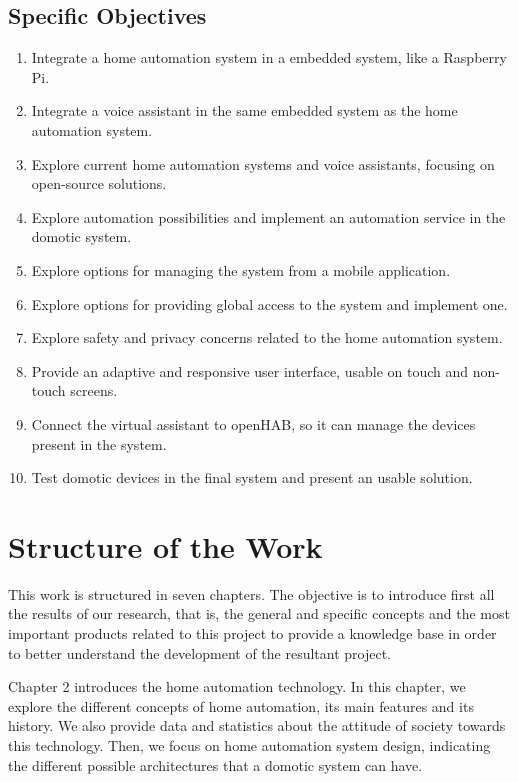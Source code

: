 \subsection{Specific Objectives}
\begin{enumerate}
	\item Integrate a home automation system in a embedded system, like a Raspberry Pi.
	\item Integrate a voice assistant in the same embedded system as the home automation system.
	\item Explore current home automation systems and voice assistants, focusing on open-source solutions.
	\item Explore automation possibilities and implement an automation service in the domotic system.
	\item Explore options for managing the system from a mobile application.
	\item Explore options for providing global access to the system and implement one.
	\item Explore safety and privacy concerns related to the home automation system.
	\item Provide an adaptive and responsive user interface, usable on touch and non-touch screens.
	\item Connect the virtual assistant to openHAB, so it can manage the devices present in the system.
	\item Test domotic devices in the final system and present an usable solution.
\end{enumerate}

\section{Structure of the Work}
This work is structured in seven chapters. The objective is to introduce first all the results of our research, that is, the general
and specific concepts and the most important products related to this project to provide a knowledge base in order to better
understand the development of the resultant project.

Chapter 2 introduces the home automation technology. In this chapter, we explore the different concepts of home automation,
its main features and its history. We also provide data and statistics about the attitude of society towards this technology. Then,
we focus on home automation system design, indicating the different possible architectures that a domotic system can have.

